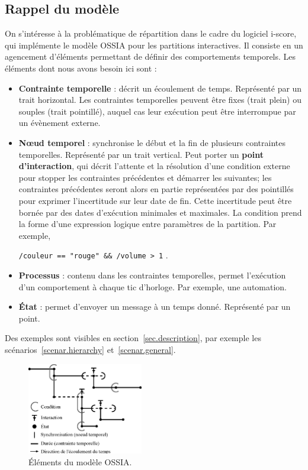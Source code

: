 \documentclass[10pt]{article}
\newcommand\ossia{OSSIA\xspace}
\newcommand\vocab[1]{\textbf{#1}}
\begin{document}
\subsection{Rappel du modèle}
On s'intéresse à la problématique de répartition dans le cadre du logiciel i-score, qui implémente le modèle \ossia\cite{celerier2015ossia} pour les partitions interactives.
Il consiste en un agencement d'éléments permettant de définir des comportements temporels. 
Les éléments dont nous avons besoin ici sont : 
\begin{itemize}
	\item \vocab{Contrainte temporelle} : décrit un écoulement de temps. 
    Représenté par un trait horizontal. Les contraintes temporelles peuvent être fixes (trait plein) ou souples (trait pointillé), auquel cas leur exécution peut être interrompue par un évènement externe.
	\item \vocab{Nœud temporel} : synchronise le début et la fin de plusieurs contraintes temporelles. Représenté par un trait vertical.
	Peut porter un \vocab{point d'interaction}, qui décrit l'attente et la résolution d'une condition externe pour stopper les contraintes précédentes et démarrer les suivantes; les contraintes précédentes seront alors en partie représentées par des pointillés pour exprimer l'incertitude sur leur date de fin. 
    Cette incertitude peut être bornée par des dates d'exécution minimales et maximales.
    La condition prend la forme d'une expression logique entre paramètres de la partition. Par exemple, 
    
    \lstinline|/couleur == "rouge" && /volume > 1| .
	\item \vocab{Processus} : contenu dans les contraintes temporelles, permet l'exécution d'un comportement à chaque tic d'horloge. Par exemple, une automation.
	\item \vocab{État} : permet d'envoyer un message à un temps donné. Représenté par un point.
\end{itemize}
Des exemples sont visibles en section~\ref{sec.description}, par exemple les scénarios~\ref{scenar.hierarchy} et~\ref{scenar.general}.

\begin{figure}[h]
    \centering
    \includegraphics[width=0.45\textwidth]{scenarios/iscore-example.eps}
    \caption{Éléments du modèle \ossia.}
    \label{fig.ossia}
\end{figure}
\end{document}
